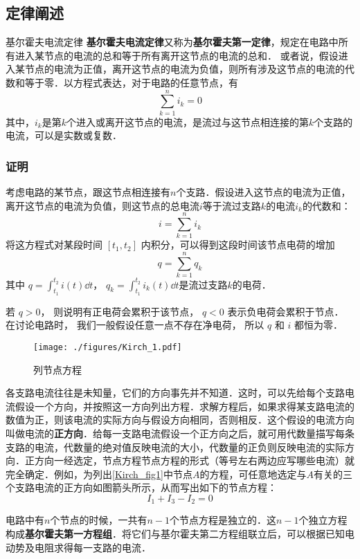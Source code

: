 

\subsection{定律阐述}
\begin{theorem}{基尔霍夫电流定律}
\textbf{基尔霍夫电流定律}又称为\textbf{基尔霍夫第一定律}，规定在电路中所有进入某节点的电流的总和等于所有离开这节点的电流的总和． 或者说，假设进入某节点的电流为正值，离开这节点的电流为负值，则所有涉及这节点的电流的代数和等于零．以方程式表达，对于电路的任意节点，有
\begin{equation}
\sum_{k=1}^n i_k =0
\end{equation}
其中，$i_k$是第$k$个进入或离开这节点的电流，是流过与这节点相连接的第$k$个支路的电流，可以是实数或复数．
\end{theorem}

\subsubsection{证明}
考虑电路的某节点，跟这节点相连接有$n$个支路．假设进入这节点的电流为正值，离开这节点的电流为负值，则这节点的总电流$i$等于流过支路$k$的电流$i_k$的代数和：
\begin{equation}
i=\sum_{k=1}^n i_k
\end{equation}
将这方程式对某段时间 $[t_1, t_2]$ 内积分，可以得到这段时间该节点电荷的增加
\begin{equation}
q=\sum_{k=1}^n q_k
\end{equation}
其中 $q = \int_{t_1}^{t_2} i(t) \dd{t}$， $q_k=\int_{t_1}^{t_2} i_k(t) \dd{t}$是流过支路$k$的电荷．

若 $q>0$， 则说明有正电荷会累积于该节点， $q < 0$ 表示负电荷会累积于节点． 在讨论电路时， 我们一般假设任意一点不存在净电荷， 所以 $q$ 和 $i$ 都恒为零．

\begin{example}{}

\begin{figure}[ht]
\centering
\texttt{[image: ./figures/Kirch\_1.pdf]}
\caption{列节点方程} \label{Kirch_fig1}
\end{figure}
各支路电流往往是未知量，它们的方向事先并不知道．这时，可以先给每个支路电流假设一个方向，并按照这一方向列出方程．求解方程后，如果求得某支路电流的数值为正，则该电流的实际方向与假设方向相同，否则相反．这个假设的电流方向叫做电流的\textbf{正方向}．给每一支路电流假设一个正方向之后，就可用代数量描写每条支路的电流，代数量的绝对值反映电流的大小，代数量的正负则反映电流的实际方向．正方向一经选定，节点方程节点方程的形式（等号左右两边应写哪些电流）就完全确定．例如，为列出\autoref{Kirch_fig1}中节点$A$的方程，可任意地选定与$A $有关的三个支路电流的正方向如图箭头所示，从而写出如下的节点方程：
\begin{equation}
I_1+I_3-I_2=0
\end{equation}
\end{example}
电路中有$n$个节点的时候，一共有$n-1$个节点方程是独立的．这$n-1$个独立方程构成\textbf{基尔霍夫第一方程组}．将它们与基尔霍夫第二方程组联立后，可以根据已知电动势及电阻求得每一支路的电流．

